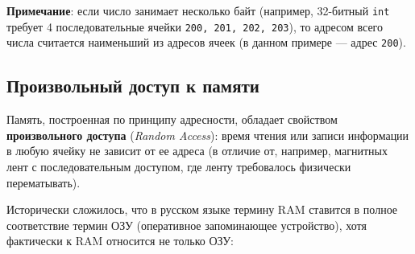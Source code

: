 \documentclass[11pt,a4paper]{article}
\begin{document}
\begin{center}
\end{center}

\textbf{Примечание}: если число занимает несколько байт (например, 32-битный \texttt{int} требует 4 последовательные ячейки \texttt{200, 201, 202, 203}), то адресом всего числа считается наименьший из адресов ячеек (в данном примере --- адрес \texttt{200}).

\subsection{Произвольный доступ к памяти}
Память, построенная по принципу адресности, обладает свойством \textbf{произвольного доступа} (\textit{Random Access}): время чтения или записи информации в любую ячейку не зависит от ее адреса (в отличие от, например, магнитных лент с последовательным доступом, где ленту требовалось физически перематывать).

Исторически сложилось, что в русском языке термину RAM ставится в полное соответствие термин ОЗУ (оперативное запоминающее устройство), хотя фактически к RAM относится не только ОЗУ:
\end{document}
